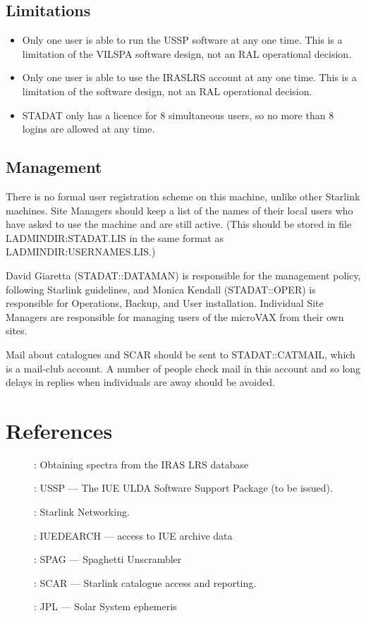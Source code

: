 \documentclass[nolof,11pt,noabs]{starlink}
\begin{document}
\subsection{Limitations}

\begin{itemize}
\item Only one user is able to run the USSP software at any one time.
This is a limitation of the VILSPA software design, not an RAL operational
decision.
\item Only one user is able to use the IRASLRS account at any one time.
This is a limitation of the software design, not an RAL operational
decision.
\item STADAT only has a licence for 8 simultaneous users, so no more than 8
logins are allowed at any time.
\end {itemize}

\subsection{Management}

There is no formal user registration scheme on this machine, unlike other
Starlink machines.
Site Managers should keep a list of the names of their local users who have
asked to use the machine and are still active.
(This should be stored in file LADMINDIR:STADAT.LIS in the same format as
LADMINDIR:USERNAMES.LIS.)

David Giaretta (STADAT::DATAMAN)
is responsible for the management policy, following Starlink
guidelines, and
Monica Kendall (STADAT::OPER) is responsible for Operations,
Backup, and User installation.
Individual Site Managers are responsible for managing users of the microVAX
from their own sites.

Mail about catalogues and SCAR
should be sent to STADAT::CATMAIL, which is a mail-club account. A number
of people  check mail in this account and so long delays in replies when
individuals are away should be avoided.

\section{References}

\begin{description}
\item [] : Obtaining spectra from the IRAS LRS database
\item [] : USSP --- The IUE ULDA Software Support Package (to be issued).
\item [] : Starlink Networking.
\item [] : IUEDEARCH --- access to IUE archive data
\item [] : SPAG --- Spaghetti Unscrambler
\item [] : SCAR --- Starlink catalogue access and reporting.
\item [] : JPL --- Solar System ephemeris
\end{description}
\end{document}
